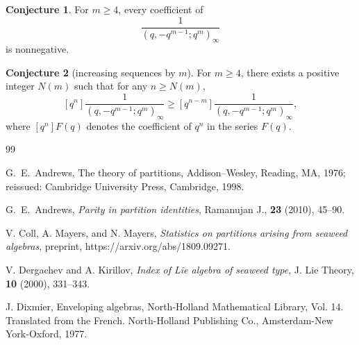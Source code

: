 \documentclass[reqno]{amsart}
\theoremstyle{definition}
\newtheorem{cnj}{Conjecture}%
\begin{document}
\begin{cnj} For $m\ge 4$, every coefficient of
$$\dfrac{1}{(q,-q^{m-1};q^m)_\infty} $$ is nonnegative.
\end{cnj}

\begin{cnj}[increasing sequences by $m$] \label{conj5}
For $m \ge 4$, there exists a positive integer $N(m)$ such that  for any $n\ge N(m)$, 
$$
\left[q^n\right] \dfrac{1}{(q,-q^{m-1};q^m)_{\infty}} \ge \left[q^{n-m}\right] \dfrac{1}{(q,-q^{m-1};q^m)_{\infty}
},
$$
where  $[q^n]F(q)$ denotes the coefficient of $q^n$ in the series $F(q)$. 
\end{cnj}

\begin{thebibliography}{99}

G.~E.~Andrews, {The theory of partitions},  Addison--Wesley, Reading, MA, 1976; reissued: Cambridge University Press, Cambridge, 1998.

G.~E.~Andrews, {\it Parity in partition identities}, Ramanujan J., {\bf 23} (2010), 45--90.

V. Coll, A. Mayers, and N. Mayers, {\it Statistics on partitions arising from seaweed algebras}, preprint, https://arxiv.org/abs/1809.09271. 

V. Dergachev and A. Kirillov, {\it Index of Lie algebra of seaweed type}, J. Lie Theory, {\bf 10} (2000), 331--343.

J. Dixmier, {Enveloping algebras}, North-Holland Mathematical Library, Vol. 14. Translated from the French. North-Holland Publishing Co., Amsterdam-New York-Oxford, 1977.


\end{thebibliography}
\end{document}
